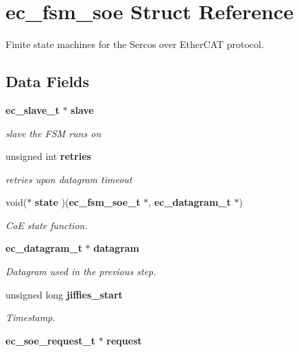 \section{ec\-\_\-fsm\-\_\-soe \-Struct \-Reference}
\label{structec__fsm__soe}


\-Finite state machines for the \-Sercos over \-Ether\-C\-A\-T protocol.  


\subsection*{\-Data \-Fields}
\begin{DoxyCompactItemize}
\item 
{\bf ec\-\_\-slave\-\_\-t} $\ast$ {\bf slave}\label{structec__fsm__soe_ac70c33e8ea8a98b79d84c3ace3416180}

\begin{DoxyCompactList}\small\item\em slave the \-F\-S\-M runs on \end{DoxyCompactList}\item 
unsigned int {\bf retries}\label{structec__fsm__soe_a717e23d822ee8bca76b9b477ff078bb7}

\begin{DoxyCompactList}\small\item\em retries upon datagram timeout \end{DoxyCompactList}\item 
void($\ast$ {\bf state} )({\bf ec\-\_\-fsm\-\_\-soe\-\_\-t} $\ast$, {\bf ec\-\_\-datagram\-\_\-t} $\ast$)\label{structec__fsm__soe_a07bba81cf72365b14c57924a6c7b5e63}

\begin{DoxyCompactList}\small\item\em \-Co\-E state function. \end{DoxyCompactList}\item 
{\bf ec\-\_\-datagram\-\_\-t} $\ast$ {\bf datagram}
\begin{DoxyCompactList}\small\item\em \-Datagram used in the previous step. \end{DoxyCompactList}\item 
unsigned long {\bf jiffies\-\_\-start}
\begin{DoxyCompactList}\small\item\em \-Timestamp. \end{DoxyCompactList}\item 
{\bf ec\-\_\-soe\-\_\-request\-\_\-t} $\ast$ {\bf request}\label{structec__fsm__soe_add6279a51617da94d91420bb05e57a7c}


\end{DoxyCompactItemize}
